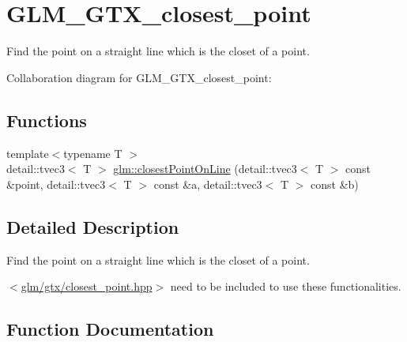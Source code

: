 \hypertarget{group__gtx__closest__point}{}\section{G\+L\+M\+\_\+\+G\+T\+X\+\_\+closest\+\_\+point}
\label{group__gtx__closest__point}


Find the point on a straight line which is the closet of a point.  


Collaboration diagram for G\+L\+M\+\_\+\+G\+T\+X\+\_\+closest\+\_\+point\+:
\subsection*{Functions}
\begin{DoxyCompactItemize}
\item 
{\footnotesize template$<$typename T $>$ }\\detail\+::tvec3$<$ T $>$ \hyperlink{group__gtx__closest__point_ga737bd08d425540f365db4694fb552b8b}{glm\+::closest\+Point\+On\+Line} (detail\+::tvec3$<$ T $>$ const \&point, detail\+::tvec3$<$ T $>$ const \&a, detail\+::tvec3$<$ T $>$ const \&b)
\end{DoxyCompactItemize}


\subsection{Detailed Description}
Find the point on a straight line which is the closet of a point. 

$<$\hyperlink{closest__point_8hpp_source}{glm/gtx/closest\+\_\+point.\+hpp}$>$ need to be included to use these functionalities. 

\subsection{Function Documentation}
\hypertarget{group__gtx__closest__point_ga737bd08d425540f365db4694fb552b8b}{}
